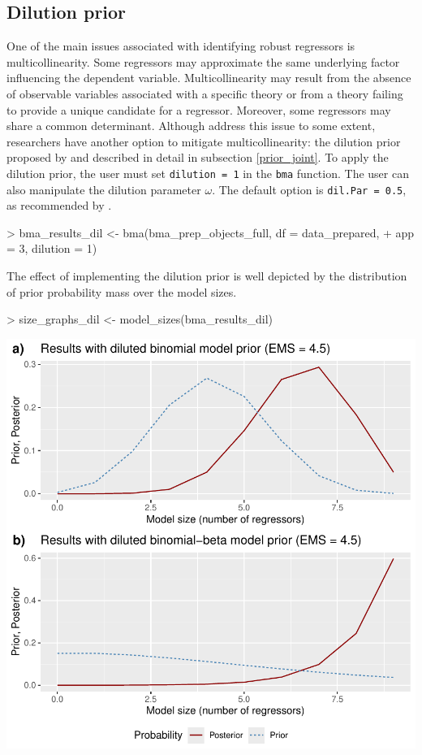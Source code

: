 \documentclass[a4paper]{article}
\begin{document}
\subsection{Dilution prior}\label{dil}
One of the main issues associated with identifying robust regressors is multicollinearity.
Some regressors may approximate the same underlying factor influencing the dependent variable.
Multicollinearity may result from the absence of observable variables associated with a specific theory or from a theory failing to provide a unique candidate for a regressor.
Moreover, some regressors may share a common determinant.
Although \citet{Moral+2013, Moral+2016} address this issue to some extent, researchers have another option to mitigate multicollinearity: the dilution prior proposed by \citet{George+2010} and described in detail in subsection \ref{prior_joint}.
To apply the dilution prior, the user must set \verb+dilution = 1+ in the \verb+bma+ function.
The user can also manipulate the dilution parameter $\omega$.
The default option is \verb+dil.Par = 0.5+, as recommended by \citet{George+2010}.
\begin{Schunk}
\begin{Sinput}
> bma_results_dil <- bma(bma_prep_objects_full, df = data_prepared,
+                        app = 3, dilution = 1)
\end{Sinput}
\end{Schunk}
The effect of implementing the dilution prior is well depicted by the distribution of prior probability mass over the model sizes.
\begin{Schunk}
\begin{Sinput}
> size_graphs_dil <- model_sizes(bma_results_dil)
\end{Sinput}
\end{Schunk}
\includegraphics{bdsm_vignette-040}
\end{document}
